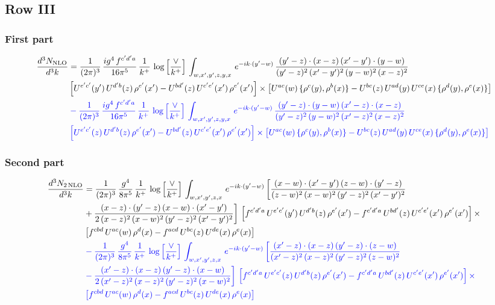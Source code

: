 \documentclass[9pt]{article}
\numberwithin{equation}{section}
\newcommand{\nc}{\color{blue}}
\begin{document}
 \subsection{Row III}
 \subsubsection{First part}
\begin{align}
\frac{d^{3}N_{\rm NLO}}{d^{3}k} & = \frac{1}{(2\pi)^{3}}\, \frac{ig^{4}\,f^{c'd'a}}{16\pi^{5}}\, \frac{1}{k^{+}}\,\log{\left[\frac{\vee}{k^{+}}\right]}\,\int_{w,x',y',z,y,x}\, e^{-ik\cdot (y'-w)}\,\frac{(y'-z)\cdot (x-z)\,(x'-y')\cdot (y-w)}{(y'-z)^{2}\,(x'-y')^{2}\,(y-w)^{2}\,(x-z)^{2}}\notag \\
& \left[U^{e'c'}(y')\,U^{d'b}(z)\,\rho^{e'}(x')-U^{bd'}(z)\,U^{c'e'}(x')\,\rho^{e'}(x')\right]\times \left[U^{ac}(w)\, \{\rho^{c}(y),\rho^{b}(x)\}-U^{bc}(z)\,U^{ad}(y)\,U^{ce}(x)\,\{\rho^{d}(y),\rho^{e}(x)\}\right]\notag \\
& \nc -\frac{1}{(2\pi)^{3}}\, \frac{ig^{4}\,f^{c'd'a}}{16\pi^{5}}\, \frac{1}{k^{+}}\,\log{\left[\frac{\vee}{k^{+}}\right]}\,\int_{w,x',y',z,y,x}\, e^{-ik\cdot (y'-w)}\,\frac{(y'-z)\cdot (y-w)\,(x'-z)\cdot (x-z)}{(y'-z)^{2}\,(y-w)^{2}\,(x'-z)^{2}\,(x-z)^{2}}\notag \\
& \nc \left[U^{e'c'}(z)\,U^{d'b}(z)\,\rho^{e'}(x')-U^{bd'}(z)\,U^{c'e'}(x')\,\rho^{e'}(x')\right]\times \left[U^{ac}(w)\, \{\rho^{c}(y),\rho^{b}(x)\}-U^{bc}(z)\,U^{ad}(y)\,U^{ce}(x)\,\{\rho^{d}(y),\rho^{e}(x)\}\right]
\end{align}
\subsubsection{Second part}
\begin{align}
\frac{d^{3}N_{2\,\rm NLO}}{d^{3}k} & = \frac{1}{(2\pi)^{3}}\,\frac{g^{4}}{8\pi^{5}}\,\frac{1}{k^{+}}\,\log{\left[\frac{\vee}{k^{+}}\right]}\,\int_{w,x',y',z,x}\, e^{-ik\cdot (y'-w)}\,\bigg[\frac{(x-w)\cdot (x'-y')\,(z-w)\cdot (y'-z)}{(z-w)^{2}\,(x-w)^{2}\,(y'-z)^{2}\,(x'-y')^{2}}\notag \\
& +\frac{(x-z)\cdot (y'-z)\,(x-w)\cdot (x'-y')}{2\,(x-z)^{2}\,(x-w)^{2}\,(y'-z)^{2}\,(x'-y')^{2}}\bigg]\, \left[f^{c'd'a}\,U^{e'c'}(y')\,U^{d'b}(z)\,\rho^{e'}(x')-f^{c'd'a}\, U^{bd'}(z)\,U^{c'e'}(x')\,\rho^{e'}(x')\right]\times\notag \\
& \left[f^{cbd}\,U^{ac}(w)\,\rho^{d}(x) -f^{acd}\,U^{bc}(z)\,U^{de}(x)\,\rho^{e}(x)\right]\notag \\
& \nc -\frac{1}{(2\pi)^{3}}\,\frac{g^{4}}{8\pi^{5}}\,\frac{1}{k^{+}}\,\log{\left[\frac{\vee}{k^{+}}\right]}\,\int_{w,x',y',z,x}\, e^{-ik\cdot (y'-w)}\,\bigg[\frac{(x'-z)\cdot (x-z)\,(y'-z)\cdot (z-w)}{(x'-z)^{2}\,(x-z)^{2}\,(y'-z)^{2}\,(z-w)^{2}}\notag \\
& \nc -\frac{(x'-z)\cdot (x-z)\,(y'-z)\cdot (x-w)}{2\,(x'-z)^{2}\,(x-z)^{2}\,(y'-z)^{2}\,(x-w)^{2}}\bigg]\, \left[f^{c'd'a}\,U^{e'c'}(z)\,U^{d'b}(z)\,\rho^{e'}(x')-f^{c'd'a}\, U^{bd'}(z)\,U^{c'e'}(x')\,\rho^{e'}(x')\right]\times\notag \\
& \nc \left[f^{cbd}\,U^{ac}(w)\,\rho^{d}(x) -f^{acd}\,U^{bc}(z)\,U^{de}(x)\,\rho^{e}(x)\right]
\end{align}
\end{document}
